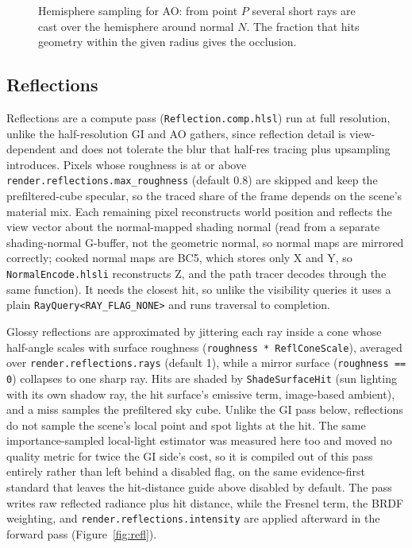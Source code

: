 \begin{figure}[tbp]
\centering
{}
\caption[Hemisphere sampling for ambient occlusion]{Hemisphere sampling for AO: from point $P$ several short rays are cast over the hemisphere
around normal $N$. The fraction that hits geometry within the given radius gives the occlusion.}
\label{fig:ao}
\end{figure}

\subsection{Reflections}

Reflections are a compute pass (\texttt{Reflection.comp.hlsl}) run at full resolution, unlike the
half-resolution GI and AO gathers, since reflection detail is view-dependent and does not
tolerate the blur that half-res tracing plus upsampling introduces. Pixels whose roughness is at or above \texttt{render.reflections.max\_roughness} (default 0.8) are
skipped and keep the prefiltered-cube specular, so the traced share of the frame depends on the
scene's material mix. Each remaining pixel reconstructs world
position and reflects the view vector about the normal-mapped shading normal (read from a separate
shading-normal G-buffer, not the geometric normal, so normal maps are mirrored correctly; cooked normal maps are BC5, which stores only X and Y, so \texttt{NormalEncode.hlsli} reconstructs Z, and the path tracer decodes through the same function). It needs
the closest hit, so unlike the visibility queries it uses a plain \texttt{RayQuery<RAY_FLAG_NONE>}
and runs traversal to completion.

Glossy reflections are approximated by jittering each ray inside a cone whose half-angle scales with
surface roughness (\texttt{roughness * ReflConeScale}), averaged over \texttt{render.reflections.rays}
(default 1), while a mirror surface (\texttt{roughness == 0}) collapses to one sharp ray. Hits are
shaded by \texttt{ShadeSurfaceHit} (sun lighting with its own shadow ray, the hit surface's emissive
term, image-based ambient), and a miss samples the prefiltered sky cube. Unlike the GI pass below,
reflections do not sample the scene's local point and spot lights at the hit. The same
importance-sampled local-light estimator was measured here too and moved no quality metric for twice
the GI side's cost, so it is compiled out of this pass entirely rather than left behind a disabled
flag, on the same evidence-first standard that leaves the hit-distance guide above disabled by
default. The pass writes raw reflected radiance plus hit distance,
while the Fresnel term, the BRDF weighting, and \texttt{render.reflections.intensity} are applied
afterward in the forward pass (Figure~\ref{fig:refl}).

